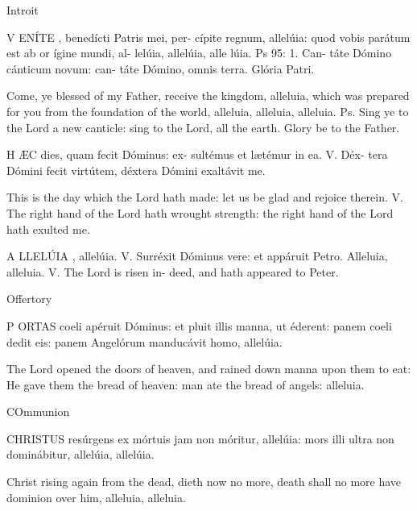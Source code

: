 Introit

V
ENÍTE
,  benedícti  Patris  mei,  per-
cípite  regnum,  allelúia:  quod  vobis  
parátum  est  ab  or
ígine  mundi,  al-
lelúia, allelúia, alle
lúia. Ps 95: 1. Can-
táte Dómino cánticum novum: can-
táte  Dómino,  omnis  terra.    Glória Patri. 

Come, ye blessed of my Father, receive the 
kingdom,  alleluia,  which  was  prepared  for  
you  from  the  foundation  of  the  world,  
alleluia,  alleluia,  alleluia.  Ps.  Sing  ye  to  the  
Lord  a  new  canticle:  sing  to  the  Lord,  all  
the earth. Glory be to the Father.


H
ÆC
 dies, quam fecit Dóminus: ex-
sultémus  et  lætémur  in  ea.  V.  Déx-
tera  Dómini  fecit  virtútem,  déxtera  
Dómini exaltávit me.  

This is the day which the Lord hath made: 
let  us  be  glad  and  rejoice  therein.  V.    The  
right   hand   of   the   Lord   hath   wrought   
strength:  the  right  hand  of  the  Lord  hath  
exulted me. 

A
LLELÚIA
,    allelúia.    V.    Surréxit    
Dóminus vere: et appáruit Petro. 
Alleluia,  alleluia.  V.  The  Lord  is  risen  in-
deed, and hath appeared to Peter.


Offertory

P
ORTAS
  coeli  apéruit  Dóminus:  et  
pluit  illis  manna,  ut  éderent:  panem  
coeli  dedit  eis:  panem  Angelórum  
manducávit homo, allelúia. 

The Lord opened the doors of heaven, and 
rained down manna upon them to eat: He 
gave  them  the  bread  of  heaven:  man  ate  
the bread of angels: alleluia. 

COmmunion

CHRISTUS
  resúrgens  ex  mórtuis  jam  
non  móritur,  allelúia:  mors  illi  ultra  
non dominábitur, allelúia, allelúia. 

Christ  rising  again  from  the  dead,  dieth  
now  no  more,  death  shall  no  more  have  
dominion over him, alleluia, alleluia. 

